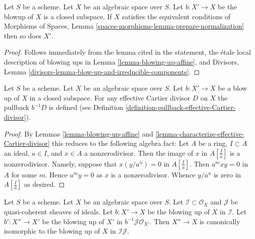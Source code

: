 \begin{lemma}
\label{lemma-blowup-finite-nr-irreducibles}
Let $S$ be a scheme. Let $X$ be an algebraic space over $S$. Let
$b : X' \to X$ be the blowup of $X$ is a closed subspace. If
$X$ satisfies the equivalent conditions of
Morphisms of Spaces, Lemma \ref{spaces-morphisms-lemma-prepare-normalization}
then so does $X'$.
\end{lemma}

\begin{proof}
Follows immediately from the lemma cited in the statement,
the \'etale local description of blowing ups in
Lemma \ref{lemma-blowing-up-affine}, and
Divisors, Lemma \ref{divisors-lemma-blow-up-and-irreducible-components}.
\end{proof}

\begin{lemma}
\label{lemma-blow-up-pullback-effective-Cartier}
Let $S$ be a scheme. Let $X$ be an algebraic space over $S$.
Let $b : X' \to X$ be a blow up of $X$ in a closed subspace.
For any effective Cartier divisor $D$ on $X$ the pullback
$b^{-1}D$ is defined (see Definition
\ref{definition-pullback-effective-Cartier-divisor}).
\end{lemma}

\begin{proof}
By Lemmas \ref{lemma-blowing-up-affine} and
\ref{lemma-characterize-effective-Cartier-divisor}
this reduces to the following algebra fact:
Let $A$ be a ring, $I \subset A$ an ideal, $a \in I$, and $x \in A$
a nonzerodivisor. Then the image of $x$ in $A[\frac{I}{a}]$ is a
nonzerodivisor. Namely, suppose that $x (y/a^n) = 0$ in $A[\frac{I}{a}]$.
Then $a^mxy = 0$ in $A$ for some $m$. Hence $a^my = 0$ as $x$ is a
nonzerodivisor. Whence $y/a^n$ is zero in $A[\frac{I}{a}]$ as desired.
\end{proof}

\begin{lemma}
\label{lemma-blowing-up-two-ideals}
Let $S$ be a scheme. Let $X$ be an algebraic space over $S$.
Let $\mathcal{I} \subset \mathcal{O}_X$ and $\mathcal{J}$ be
quasi-coherent sheaves of ideals. Let $b : X' \to X$ be the blowing up
of $X$ in $\mathcal{I}$. Let $b' : X'' \to X'$ be the blowing up of
$X'$ in $b^{-1}\mathcal{J} \mathcal{O}_{X'}$. Then $X'' \to X$
is canonically isomorphic to the blowing up of $X$ in $\mathcal{I}\mathcal{J}$.
\end{lemma}

